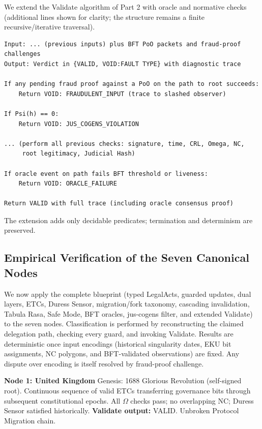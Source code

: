 \documentclass[11pt,a4paper]{article}
\begin{document}
We extend the Validate algorithm of Part 2 with oracle and normative checks (additional lines shown for clarity; the structure remains a finite recursive/iterative traversal).

\begin{lstlisting}[caption={Validate(h, D, Inputs) — Extended}, label={alg:validate_ext}]
Input: ... (previous inputs) plus BFT PoO packets and fraud-proof challenges
Output: Verdict in {VALID, VOID:FAULT TYPE} with diagnostic trace

If any pending fraud proof against a PoO on the path to root succeeds:
    Return VOID: FRAUDULENT_INPUT (trace to slashed observer)

If Psi(h) == 0:
    Return VOID: JUS_COGENS_VIOLATION

... (perform all previous checks: signature, time, CRL, Omega, NC, 
     root legitimacy, Judicial Hash)

If oracle event on path fails BFT threshold or liveness:
    Return VOID: ORACLE_FAILURE

Return VALID with full trace (including oracle consensus proof)
\end{lstlisting}

The extension adds only decidable predicates; termination and determinism are preserved.

\subsection{Empirical Verification of the Seven Canonical Nodes}

We now apply the complete blueprint (typed LegalActs, guarded updates, dual layers, ETCs, Duress Sensor, migration/fork taxonomy, cascading invalidation, Tabula Rasa, Safe Mode, BFT oracles, jus-cogens filter, and extended Validate) to the seven nodes. Classification is performed by reconstructing the claimed delegation path, checking every guard, and invoking Validate. Results are deterministic once input encodings (historical singularity dates, EKU bit assignments, NC polygons, and BFT-validated observations) are fixed. Any dispute over encoding is itself resolved by fraud-proof challenge.

\textbf{Node 1: United Kingdom}  
Genesis: 1688 Glorious Revolution (self-signed root). Continuous sequence of valid ETCs transferring governance bits through subsequent constitutional epochs. All \(\Omega\) checks pass; no overlapping NC; Duress Sensor satisfied historically.  
\textbf{Validate output:} VALID. Unbroken Protocol Migration chain.
\end{document}
